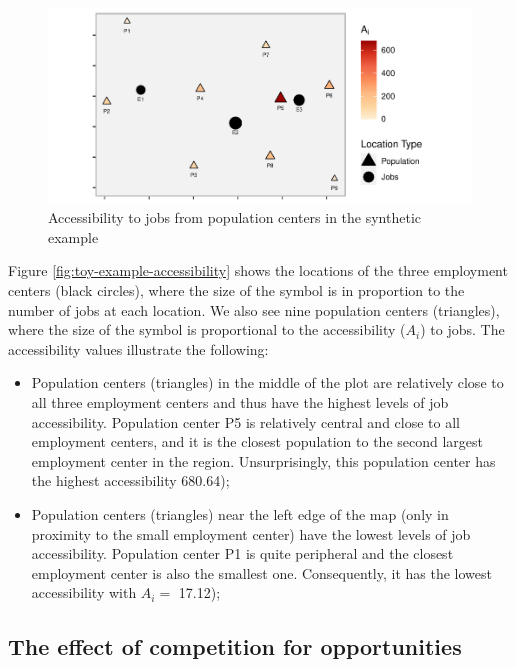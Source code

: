 \documentclass[]{elsarticle} %
\begin{document}
\begin{figure}
\includegraphics[width=1\linewidth]{Spatial-Availability_files/figure-latex/toy-example-accessibility-plot-1} \caption{\label{fig:toy-example-accessibility}Accessibility to jobs from population centers in the synthetic example}\label{fig:toy-example-accessibility-plot}
\end{figure}

Figure \ref{fig:toy-example-accessibility} shows the locations of the
three employment centers (black circles), where the size of the symbol
is in proportion to the number of jobs at each location. We also see
nine population centers (triangles), where the size of the symbol is
proportional to the accessibility (\(A_i\)) to jobs. The accessibility
values illustrate the following:

\begin{itemize}
\item
  Population centers (triangles) in the middle of the plot are
  relatively close to all three employment centers and thus have the
  highest levels of job accessibility. Population center P5 is
  relatively central and close to all employment centers, and it is the
  closest population to the second largest employment center in the
  region. Unsurprisingly, this population center has the highest
  accessibility 680.64);
\item
  Population centers (triangles) near the left edge of the map (only in
  proximity to the small employment center) have the lowest levels of
  job accessibility. Population center P1 is quite peripheral and the
  closest employment center is also the smallest one. Consequently, it
  has the lowest accessibility with \(A_i=\) 17.12);
\end{itemize}

\hypertarget{the-effect-of-competition-for-opportunities}{%
\subsection{The effect of competition for
opportunities}\label{the-effect-of-competition-for-opportunities}}
\end{document}
